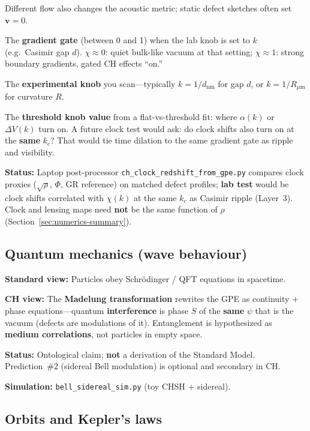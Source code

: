 \documentclass[11pt,a4paper]{article}
\begin{document}
\begin{description}[style=nextline, leftmargin=1.5em, font=\normalfont]
    Different flow also changes the acoustic metric; static defect sketches often set $\mathbf{v}=0$.
  \item[$\chi(k)$]
    The \textbf{gradient gate} (between 0 and 1) when the lab knob is set to $k$ (e.g.\ Casimir gap $d$).
    $\chi \approx 0$: quiet bulk-like vacuum at that setting; $\chi \approx 1$: strong boundary gradients, gated CH effects ``on.''
  \item[$k$]
    The \textbf{experimental knob} you scan---typically $k = 1/d_{\mathrm{nm}}$ for gap $d$, or $k = 1/R_{\mu\mathrm{m}}$ for curvature $R$.
  \item[$k_c$]
    The \textbf{threshold knob value} from a flat-vs-threshold fit: where $\alpha(k)$ or $\Delta V(k)$ turn on.
    A future clock test would ask: do clock shifts also turn on at the \textbf{same} $k_c$? That would tie time dilation to the same gradient gate as ripple and visibility.
\end{description}

\textbf{Status:} Laptop post-processor \texttt{ch\_clock\_redshift\_from\_gpe.py} compares clock proxies ($\sqrt{\rho}$, $\Phi$, GR reference) on matched defect profiles; \textbf{lab test} would be clock shifts correlated with $\chi(k)$ at the same $k_c$ as Casimir ripple (Layer~3).
Clock and lensing maps need \textbf{not} be the same function of $\rho$ (Section~\ref{sec:numerics-summary}).

\subsection{Quantum mechanics (wave behaviour)}

\textbf{Standard view:} Particles obey Schr\"odinger / QFT equations in spacetime.

\textbf{CH view:} The \textbf{Madelung transformation} rewrites the GPE as continuity + phase equations---quantum \textbf{interference} is phase $S$ of the \textbf{same} $\psi$ that is the vacuum (defects are modulations of it).
Entanglement is hypothesized as \textbf{medium correlations}, not particles in empty space.

\textbf{Status:} Ontological claim; \textbf{not} a derivation of the Standard Model.
Prediction~\#2 (sidereal Bell modulation) is optional and secondary in CH.

\textbf{Simulation:} \texttt{bell\_sidereal\_sim.py} (toy CHSH + sidereal).

\subsection{Orbits and Kepler's laws}
\end{document}
